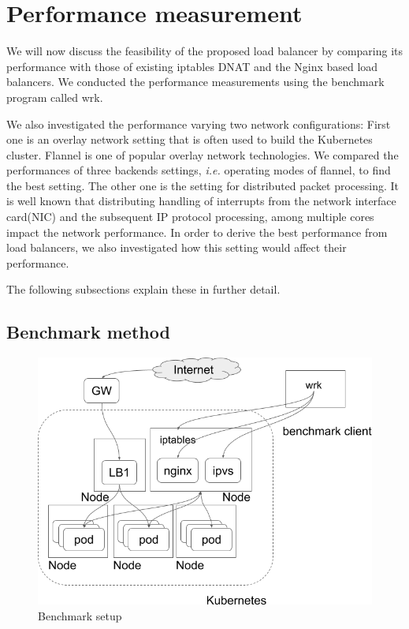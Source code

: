 \section{Performance measurement}\label{Performance Measurement}


We will now discuss the feasibility of the proposed load balancer by comparing 
its performance with those of existing iptables DNAT and the Nginx based load balancers. 
We conducted the performance measurements using the benchmark program called wrk\cite{Glozer2016}.

We also investigated the performance varying two network configurations: 
First one is an overlay network setting\cite{Sill2016,Marmol2015} that is often used to build the Kubernetes cluster. 
Flannel\cite{CoreOSFlannel} is one of popular overlay network technologies. 
We compared the performances of three backends settings\cite{CoreOSFlannelBackend}, 
{\it i.e.} operating modes of flannel, to find the best setting.
The other one is the setting for distributed packet processing.
It is well known that distributing handling of interrupts from the network interface card(NIC) 
and the subsequent IP protocol processing, among multiple cores impact the network performance.
In order to derive the best performance from load balancers, 
we also investigated how this setting would affect their performance.

The following subsections explain these in further detail. 

\subsection{Benchmark method}

\begin{figure}
\includegraphics[width=\columnwidth]{Figs/benchmark-schem}
\caption{Benchmark setup}
\label{fig:benchmark-schem}
\end{figure}

